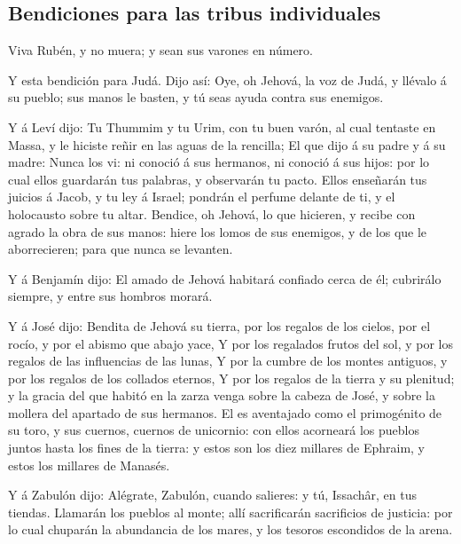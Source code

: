 \hypertarget{bendiciones-para-las-tribus-individuales}{%
\subsection{Bendiciones para las tribus
individuales}\label{bendiciones-para-las-tribus-individuales}}

 Viva Rubén, y no muera; y sean sus varones en número.

 Y esta bendición para Judá. Dijo así: Oye, oh Jehová, la
voz de Judá, y llévalo á su pueblo; sus manos le basten, y tú seas ayuda
contra sus enemigos.

 Y á Leví dijo: Tu Thummim y tu Urim, con tu buen varón, al
cual tentaste en Massa, y le hiciste reñir en las aguas de la rencilla;
 El que dijo á su padre y á su madre: Nunca los vi: ni
conoció á sus hermanos, ni conoció á sus hijos: por lo cual ellos
guardarán tus palabras, y observarán tu pacto.  Ellos
enseñarán tus juicios á Jacob, y tu ley á Israel; pondrán el perfume
delante de ti, y el holocausto sobre tu altar.  Bendice, oh
Jehová, lo que hicieren, y recibe con agrado la obra de sus manos: hiere
los lomos de sus enemigos, y de los que le aborrecieren; para que nunca
se levanten.

 Y á Benjamín dijo: El amado de Jehová habitará confiado
cerca de él; cubrirálo siempre, y entre sus hombros morará.

 Y á José dijo: Bendita de Jehová su tierra, por los
regalos de los cielos, por el rocío, y por el abismo que abajo yace,
 Y por los regalados frutos del sol, y por los regalos de
las influencias de las lunas,  Y por la cumbre de los
montes antiguos, y por los regalos de los collados eternos,
 Y por los regalos de la tierra y su plenitud; y la gracia
del que habitó en la zarza venga sobre la cabeza de José, y sobre la
mollera del apartado de sus hermanos.  El es aventajado
como el primogénito de su toro, y sus cuernos, cuernos de unicornio: con
ellos acorneará los pueblos juntos hasta los fines de la tierra: y estos
son los diez millares de Ephraim, y estos los millares de Manasés.

 Y á Zabulón dijo: Alégrate, Zabulón, cuando salieres: y
tú, Issachâr, en tus tiendas.  Llamarán los pueblos al
monte; allí sacrificarán sacrificios de justicia: por lo cual chuparán
la abundancia de los mares, y los tesoros escondidos de la arena.

